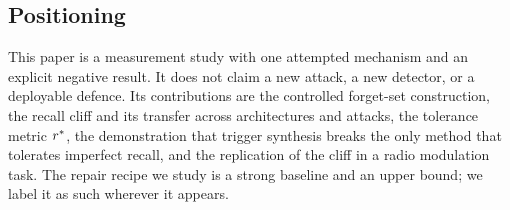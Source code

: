 \subsection{Positioning}
This paper is a measurement study with one attempted mechanism and an explicit
negative result. It does not claim a new attack, a new detector, or a deployable
defence. Its contributions are the controlled forget-set construction, the
recall cliff and its transfer across architectures and attacks, the tolerance
metric $r^{\ast}$, the demonstration that trigger synthesis breaks the only method
that tolerates imperfect recall, and the replication of the cliff in a radio
modulation task. The repair recipe we study is a strong baseline and an upper
bound; we label it as such wherever it appears.
